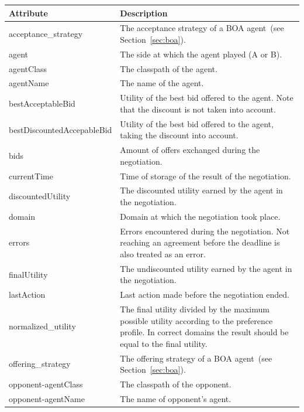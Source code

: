 \documentclass[]{article}
\begin{document}
\begin{table}[h!]
	\small
	\center
	\begin{tabular}{|p{4.7cm}|p{9.2cm}|}
		\hline\hline
		\textbf{Attribute} & \textbf{Description}\\[-0.2ex] 
		\hline\hline
		acceptance\_strategy & The acceptance strategy of a BOA agent~(see Section~\ref{sec:boa}). \\[-0.2ex]\hline
		agent & The side at which the agent played (A or B). \\[-0.2ex]\hline
		agentClass & The classpath of the agent. \\[-0.2ex]\hline
		agentName & The name of the agent. \\[-0.2ex]\hline
		bestAcceptableBid & Utility of the best bid offered to the agent. Note that the discount is not taken into account. \\[-0.2ex]\hline
		bestDiscountedAccepableBid & Utility of the best bid offered to the agent, taking the discount into account. \\[-0.2ex]\hline
		bids & Amount of offers exchanged during the negotiation. \\[-0.2ex]\hline
		currentTime & Time of storage of the result of the negotiation. \\[-0.2ex]\hline
		discountedUtility & The discounted utility earned by the agent in the negotiation. \\[-0.3ex]\hline
		domain & Domain at which the negotiation took place.\\[-0.3ex]\hline
		errors & Errors encountered during the negotiation. Not reaching an agreement before the deadline is also treated as an error.\\[-0.3ex]\hline
		finalUtility & The undiscounted utility earned by the agent in the negotiation.\\[-0.3ex]\hline
		lastAction & Last action made before the negotiation ended.\\[-0.3ex]\hline
		normalized\_utility & The final utility divided by the maximum possible utility according to the preference profile. In correct domains the result should be equal to the final utility.\\[-0.3ex]\hline
		offering\_strategy & The offering strategy of a BOA agent~(see Section~\ref{sec:boa}). \\[-0.3ex]\hline
		opponent-agentClass & The classpath of the opponent.\\[-0.3ex]\hline
		opponent-agentName & The name of opponent's agent.\\[-0.3ex]\hline

\end{tabular}
\end{table}
\end{document}

